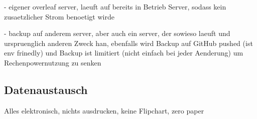 - eigener overleaf server, laeuft auf bereits in Betrieb Server, sodass kein zusaetzlicher Strom benoetigt wirde

- backup auf anderem server, aber auch ein server, der sowieso laeuft und urspruenglich anderen Zweck han, ebenfalls wird Backup auf GitHub pushed (ist env frinedly) und Backup ist limitiert (nicht einfach bei jeder Aenderung) um Rechenpowernutzung zu senken

\subsection{Datenaustausch}

Alles elektronisch, nichts ausdrucken, keine Flipchart, zero paper